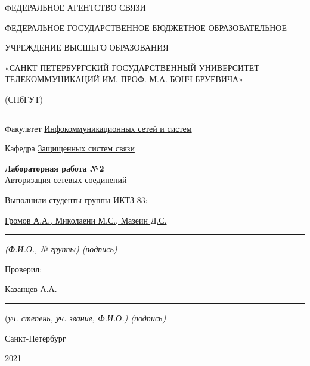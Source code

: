 \documentclass[a4paper,14pt]{extarticle}
\begin{document}
    \begin{center}
        \thispagestyle{empty}
        \begin{singlespace}
        ФЕДЕРАЛЬНОЕ АГЕНТСТВО СВЯЗИ

        ФЕДЕРАЛЬНОЕ ГОСУДАРСТВЕННОЕ БЮДЖЕТНОЕ ОБРАЗОВАТЕЛЬНОЕ

        УЧРЕЖДЕНИЕ ВЫСШЕГО ОБРАЗОВАНИЯ

        «САНКТ-ПЕТЕРБУРГСКИЙ ГОСУДАРСТВЕННЫЙ УНИВЕРСИТЕТ ТЕЛЕКОММУНИКАЦИЙ ИМ. ПРОФ. М.А. БОНЧ-БРУЕВИЧА»

        (СПбГУТ)
        \end{singlespace}
        \vspace{-1ex}
        \rule{\textwidth}{0.4pt}
        \vspace{-5ex}

        Факультет \underline{Инфокоммуникационных сетей и систем}

        Кафедра \underline{Защищенных систем связи}
        \vspace{10ex}

        \textbf{Лабораторная работа №2}\\
        Авторизация сетевых соединений
        


    \end{center}
    \vspace{4ex}
    \begin{flushright}
    \parbox{10 cm}{
    \begin{flushleft}
        Выполнили студенты группы ИКТЗ-83:

        \underline{Громов А.А., Миколаени М.С., Мазеин Д.С.} \hfill \rule[-0.85ex]{0.1\textwidth}{0.6pt}

        \footnotesize \textit{ (Ф.И.О., № группы) \hfill (подпись)} \normalsize

        Проверил:

        \underline{Казанцев А.А.} \hfill \rule[-0.85ex]{0.1\textwidth}{0.6pt}

        (\footnotesize \textit{уч. степень, уч. звание, Ф.И.О.) \hfill (подпись)} \normalsize

    \end{flushleft}
    }
    \end{flushright}
    \begin{center}
        \vfill
        Санкт-Петербург

        2021

    \end{center}
    \newpage
\end{document}
